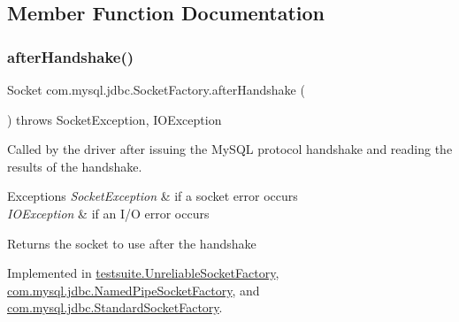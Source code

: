 \subsection{Member Function Documentation}
\mbox{\label{interfacecom_1_1mysql_1_1jdbc_1_1_socket_factory_adc5277dd008da61b24261a983202f5bf}} 
\subsubsection{\texorpdfstring{after\+Handshake()}{afterHandshake()}}
{\footnotesize\ttfamily Socket com.\+mysql.\+jdbc.\+Socket\+Factory.\+after\+Handshake (\begin{DoxyParamCaption}{ }\end{DoxyParamCaption}) throws Socket\+Exception, I\+O\+Exception}

Called by the driver after issuing the My\+S\+QL protocol handshake and reading the results of the handshake.


\begin{DoxyExceptions}{Exceptions}
{\em Socket\+Exception} & if a socket error occurs \\
\hline
{\em I\+O\+Exception} & if an I/O error occurs\\
\hline
\end{DoxyExceptions}
\begin{DoxyReturn}{Returns}
the socket to use after the handshake 
\end{DoxyReturn}


Implemented in \mbox{\hyperlink{classtestsuite_1_1_unreliable_socket_factory_ab50d6b1a289f6f7205ab9ee2a2492673}{testsuite.\+Unreliable\+Socket\+Factory}}, \mbox{\hyperlink{classcom_1_1mysql_1_1jdbc_1_1_named_pipe_socket_factory_abcc02b328b87ff64d3f7e6556af8a6ce}{com.\+mysql.\+jdbc.\+Named\+Pipe\+Socket\+Factory}}, and \mbox{\hyperlink{classcom_1_1mysql_1_1jdbc_1_1_standard_socket_factory_a7387cf40cb31ead4c39dcc642d1980b5}{com.\+mysql.\+jdbc.\+Standard\+Socket\+Factory}}.

\mbox{\label{interfacecom_1_1mysql_1_1jdbc_1_1_socket_factory_aa9a78553a76681f49c734aaa3f8f126b}} 
